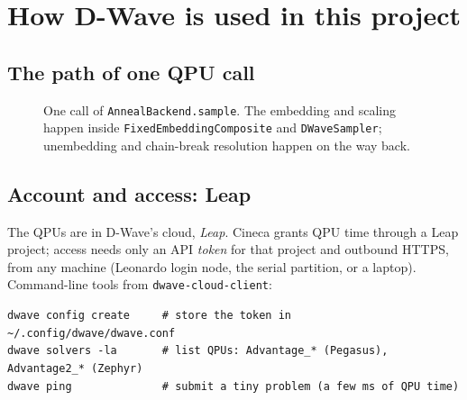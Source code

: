 \documentclass[11pt,a4paper]{article}
\newcommand{\code}[1]{\nolinkurl{#1}}
\begin{document}
\section{How D-Wave is used in this project}

\subsection{The path of one QPU call}
\begin{figure}[H]\centering
{}
\caption{One call of \code{AnnealBackend.sample}. The embedding and scaling happen inside
\code{FixedEmbeddingComposite} and \code{DWaveSampler}; unembedding and chain-break resolution happen on the way back.}
\end{figure}

\subsection{Account and access: Leap}
The QPUs are in D-Wave's cloud, \emph{Leap}. Cineca grants QPU time through a Leap project; access needs only
an API \emph{token} for that project and outbound HTTPS, from any machine (Leonardo login node, the serial
partition, or a laptop). Command-line tools from \code{dwave-cloud-client}:
\begin{lstlisting}
dwave config create     # store the token in ~/.config/dwave/dwave.conf
dwave solvers -la       # list QPUs: Advantage_* (Pegasus), Advantage2_* (Zephyr)
dwave ping              # submit a tiny problem (a few ms of QPU time)
\end{lstlisting}
\end{document}
